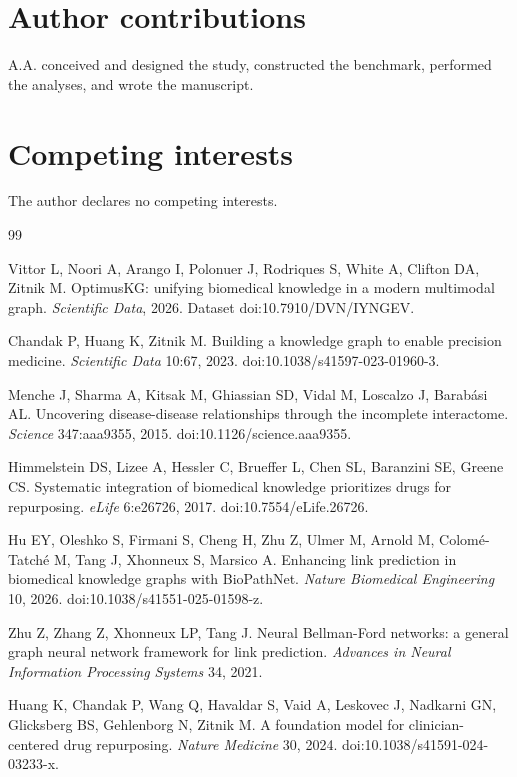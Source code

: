 \documentclass[11pt]{article}
\begin{document}
\section*{Author contributions}
A.A. conceived and designed the study, constructed the benchmark, performed the analyses, and wrote the manuscript.

\section*{Competing interests}
The author declares no competing interests.

\begin{thebibliography}{99}
\small

 Vittor L, Noori A, Arango I, Polonuer J, Rodriques S, White A, Clifton DA, Zitnik M. OptimusKG: unifying biomedical knowledge in a modern multimodal graph. \textit{Scientific Data}, 2026. Dataset doi:10.7910/DVN/IYNGEV.

 Chandak P, Huang K, Zitnik M. Building a knowledge graph to enable precision medicine. \textit{Scientific Data} 10:67, 2023. doi:10.1038/s41597-023-01960-3.

 Menche J, Sharma A, Kitsak M, Ghiassian SD, Vidal M, Loscalzo J, Barab\'{a}si AL. Uncovering disease-disease relationships through the incomplete interactome. \textit{Science} 347:aaa9355, 2015. doi:10.1126/science.aaa9355.

 Himmelstein DS, Lizee A, Hessler C, Brueffer L, Chen SL, Baranzini SE, Greene CS. Systematic integration of biomedical knowledge prioritizes drugs for repurposing. \textit{eLife} 6:e26726, 2017. doi:10.7554/eLife.26726.

 Hu EY, Oleshko S, Firmani S, Cheng H, Zhu Z, Ulmer M, Arnold M, Colom\'{e}-Tatch\'{e} M, Tang J, Xhonneux S, Marsico A. Enhancing link prediction in biomedical knowledge graphs with BioPathNet. \textit{Nature Biomedical Engineering} 10, 2026. doi:10.1038/s41551-025-01598-z.

 Zhu Z, Zhang Z, Xhonneux LP, Tang J. Neural Bellman-Ford networks: a general graph neural network framework for link prediction. \textit{Advances in Neural Information Processing Systems} 34, 2021.

 Huang K, Chandak P, Wang Q, Havaldar S, Vaid A, Leskovec J, Nadkarni GN, Glicksberg BS, Gehlenborg N, Zitnik M. A foundation model for clinician-centered drug repurposing. \textit{Nature Medicine} 30, 2024. doi:10.1038/s41591-024-03233-x.


\end{thebibliography}
\end{document}
